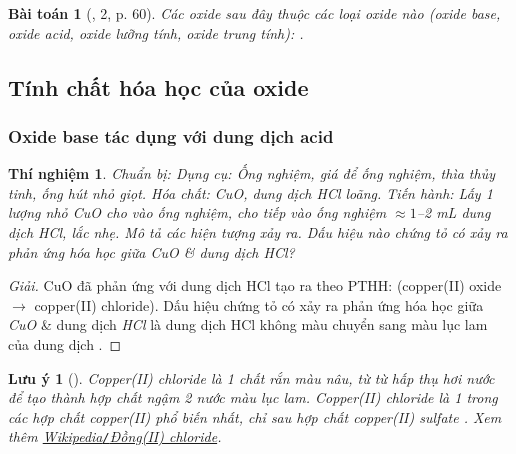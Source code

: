 \documentclass{article}
\newtheorem{baitoan}{Bài toán}
\newtheorem{luuy}{Lưu ý}
\newtheorem{thinghiem}{Thí nghiệm}
\begin{document}
\begin{baitoan}[\cite{SGK_KHTN_8_Canh_Dieu}, 2, p. 60]
	Các oxide sau đây thuộc các loại oxide nào (oxide base, oxide acid, oxide lưỡng tính, oxide trung tính): \emph{}.
\end{baitoan}

\subsection{Tính chất hóa học của oxide}

\subsubsection{Oxide base tác dụng với dung dịch acid}

\begin{thinghiem}
	\emph{Chuẩn bị:} Dụng cụ: Ống nghiệm, giá để ống nghiệm, thìa thủy tinh, ống hút nhỏ giọt. Hóa chất: \emph{CuO}, dung dịch \emph{HCl} loãng. \emph{Tiến hành:} Lấy 1 lượng nhỏ \emph{CuO} cho vào ống nghiệm, cho tiếp vào ống nghiệm $\approx1$\emph{--2 mL} dung dịch \emph{HCl}, lắc nhẹ. Mô tả các hiện tượng xảy ra. Dấu hiệu nào chứng tỏ có xảy ra phản ứng hóa học giữa \emph{CuO} \& dung dịch \emph{HCl}?
\end{thinghiem}

\begin{proof}[Giải]
	CuO đã phản ứng với dung dịch HCl tạo ra  theo PTHH:  (copper(II) oxide $\to$ copper(II) chloride). Dấu hiệu chứng tỏ có xảy ra phản ứng hóa học giữa \emph{CuO} \& dung dịch \emph{HCl} là dung dịch HCl không màu chuyển sang màu lục lam của dung dịch .
\end{proof}

\begin{luuy}[]
	Copper(II) chloride \emph{} là 1 chất rắn màu nâu, từ từ hấp thụ hơi nước để tạo thành hợp chất ngậm 2 nước màu lục lam. Copper(II) chloride là 1 trong các hợp chất copper(II) phổ biến nhất, chỉ sau hợp chất copper(II) sulfate \emph{}. Xem thêm \href{https://vi.wikipedia.org/wiki/%C4%90%E1%BB%93ng(II)_chloride}{Wikipedia\emph{\texttt{/}}Đồng(II) chloride}.
\end{luuy}
\end{document}
